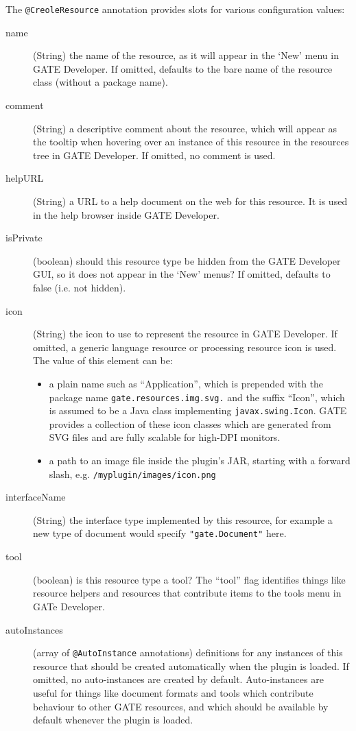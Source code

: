 The \verb|@CreoleResource| annotation provides slots for various configuration
values:
\begin{description}
\item[name] (String) the name of the resource, as it will appear in the `New'
  menu in GATE Developer.  If omitted, defaults to the bare name of the resource
  class (without a package name).
\item[comment] (String) a descriptive comment about the resource, which will
  appear as the tooltip when hovering over an instance of this
  resource in the resources tree in GATE Developer.  If omitted, no
  comment is used.
\item[helpURL] (String) a URL to a help document on the web for this
  resource. It is used in the help browser inside GATE Developer.
\item[isPrivate] (boolean) should this resource type be hidden from the GATE Developer GUI, so
  it does not appear in the `New' menus?  If omitted, defaults to
  false (i.e.  not hidden).
\item[icon] (String) the icon to use to represent the resource in GATE Developer.
  If omitted, a generic language resource or processing resource icon
  is used. The value of this element can be:
  \begin{itemize}
  \item a plain name such as ``Application'', which is prepended with the
    package name {\tt gate.resources.img.svg.} and the suffix ``Icon'', which is
    assumed to be a Java class implementing {\tt javax.swing.Icon}.  GATE
    provides a collection of these icon classes which are generated from SVG
    files and are fully scalable for high-DPI monitors.
  \item a path to an image file inside the plugin's JAR, starting with a
    forward slash, e.g. \verb|/myplugin/images/icon.png|
  \end{itemize}
\item[interfaceName] (String) the interface type implemented by this resource,
  for example a new type of document would specify \verb|"gate.Document"| here.
\item[tool] (boolean) is this resource type a tool?  The ``tool'' flag
  identifies things like resource helpers and resources that contribute items
  to the tools menu in GATe Developer.
\item[autoInstances] (array of {\tt @AutoInstance} annotations) definitions for
  any instances of this resource that should be created automatically when the
  plugin is loaded.  If omitted, no auto-instances are created by default.
  Auto-instances are useful for things like document formats and tools which
  contribute behaviour to other GATE resources, and which should be available
  by default whenever the plugin is loaded.
\end{description}

